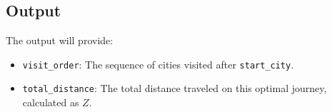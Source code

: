 \documentclass{article}
\begin{document}
\subsection*{Output}
The output will provide:
\begin{itemize}
    \item \texttt{visit\_order}: The sequence of cities visited after \texttt{start\_city}.
    \item \texttt{total\_distance}: The total distance traveled on this optimal journey, calculated as \( Z \).
\end{itemize}
\end{document}
